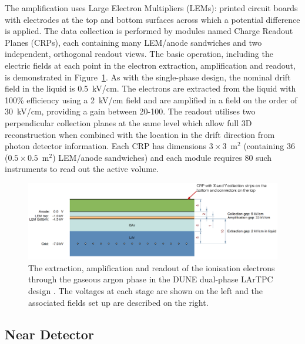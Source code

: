 The amplification uses Large Electron Multipliers (LEMs): printed circuit boards with electrodes at the top and bottom surfaces across which a potential difference is applied.  The data collection is performed by modules named Charge Readout Planes (CRPs), each containing many LEM/anode sandwiches and two independent, orthogonal readout views.  The basic operation, including the electric fields at each point in the electron extraction, amplification and readout, is demonstrated in Figure~\ref{fig:DUNEDualPhaseCRP}.  As with the single-phase design, the nominal drift field in the liquid is 0.5~kV/cm.  The electrons are extracted from the liquid with 100\% efficiency using a 2~kV/cm field and are amplified in a field on the order of 30~kV/cm, providing a gain between 20-100.  The readout utilises two perpendicular collection planes at the same level which allow full 3D reconstruction when combined with the location in the drift direction from photon detector information.  Each CRP has dimensions $3\times3$~m$^2$ (containing 36 ($0.5\times0.5$~m$^2$) LEM/anode sandwiches) and each module requires 80 such instruments to read out the active volume.

\begin{figure}
  \centering
  \includegraphics[width=14cm]{DUNEDualPhaseCRP.png}
  \caption[The extraction, amplification and readout of the ionisation electrons through the gaseous argon phase in the DUNE dual-phase LArTPC design.]{The extraction, amplification and readout of the ionisation electrons through the gaseous argon phase in the DUNE dual-phase LArTPC design \cite{DUNECDR4}.  The voltages at each stage are shown on the left and the associated fields set up are described on the right.}
  \label{fig:DUNEDualPhaseCRP}
\end{figure}

\subsection{Near Detector}\label{sec:NearDetector}

